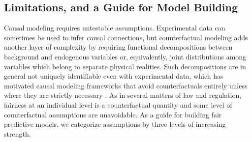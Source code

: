\subsection{Limitations, and a Guide for Model Building}

Causal modeling requires untestable assumptions. Experimental data can sometimes be used to infer causal connections, but counterfactual modeling adds another layer of complexity by requiring functional decompositions between background and endogenous variables or, equivalently, joint distributions among variables which belong to separate physical realities. Such decompositions are in general not uniquely identifiable even with experimental data, which has motivated causal modeling frameworks that avoid counterfactuals entirely unless where they are strictly necessary \citep{dawid:00}. As in several matters of law and regulation, fairness at an individual level is a counterfactual quantity and some level of counterfactual assumptions are unavoidable. As a guide for building fair predictive models, we categorize assumptions by three levels of increasing strength.

